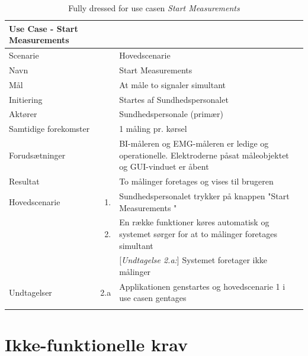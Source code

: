 \begin{longtabu} to  %
	{\large \textbf{Use Case - Start Measurements }} && \\
	\toprule
	Scenarie 				&&	Hovedscenarie\\
	Navn 					&& 	Start Measurements\\
	Mål 					&& 	At måle to signaler simultant \\
	Initiering 				&& 	Startes af Sundhedspersonalet\\
	Aktører 				&& 	Sundhedspersonale (primær)\\
	
	Samtidige forekomster  	&& 	1 måling pr. kørsel \\
	Forudsætninger 			&&	BI-måleren og EMG-måleren er ledige og operationelle. Elektroderne påsat måleobjektet og GUI-vinduet er åbent \\ 
	Resultat 				&& 	To målinger foretages og vises til brugeren\\ \midrule
	Hovedscenarie 			&    1. 	&	Sundhedspersonalet trykker på knappen "Start Measurements "\\				 	
							&    2. 	& 	En række funktioner køres automatisk og systemet sørger for at to målinger foretages simultant\\
	
	
	&&[\textit{Undtagelse 2.a:}] Systemet foretager ikke målinger\\ \midrule						
							
							
	Undtagelser 			&		2.a	& 	Applikationen genstartes og hovedscenarie 1 i use casen gentages \\ \bottomrule
	
	\caption{Fully dressed for use casen \textit{Start Measurements}}
	\label{UC1}
\end{longtabu}

\pagebreak
\section{Ikke-funktionelle krav}

